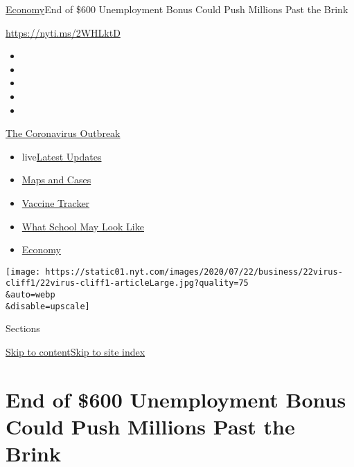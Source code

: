 \href{/section/business/economy}{Economy}\textbar{}End of \$600
Unemployment Bonus Could Push Millions Past the Brink

\url{https://nyti.ms/2WHLktD}

\begin{itemize}
\item
\item
\item
\item
\item
\end{itemize}

\href{https://www.nytimes.com/news-event/coronavirus?action=click\&pgtype=Article\&state=default\&region=TOP_BANNER\&context=storylines_menu}{The
Coronavirus Outbreak}

\begin{itemize}
\tightlist
\item
  live\href{https://www.nytimes.com/2020/08/01/world/coronavirus-covid-19.html?action=click\&pgtype=Article\&state=default\&region=TOP_BANNER\&context=storylines_menu}{Latest
  Updates}
\item
  \href{https://www.nytimes.com/interactive/2020/us/coronavirus-us-cases.html?action=click\&pgtype=Article\&state=default\&region=TOP_BANNER\&context=storylines_menu}{Maps
  and Cases}
\item
  \href{https://www.nytimes.com/interactive/2020/science/coronavirus-vaccine-tracker.html?action=click\&pgtype=Article\&state=default\&region=TOP_BANNER\&context=storylines_menu}{Vaccine
  Tracker}
\item
  \href{https://www.nytimes.com/interactive/2020/07/29/us/schools-reopening-coronavirus.html?action=click\&pgtype=Article\&state=default\&region=TOP_BANNER\&context=storylines_menu}{What
  School May Look Like}
\item
  \href{https://www.nytimes.com/live/2020/07/31/business/stock-market-today-coronavirus?action=click\&pgtype=Article\&state=default\&region=TOP_BANNER\&context=storylines_menu}{Economy}
\end{itemize}

\texttt{[image: https://static01.nyt.com/images/2020/07/22/business/22virus-cliff1/22virus-cliff1-articleLarge.jpg?quality=75\\\&auto=webp\\\&disable=upscale]}

Sections

\protect\hyperlink{site-content}{Skip to
content}\protect\hyperlink{site-index}{Skip to site index}

\hypertarget{end-of-600-unemployment-bonus-could-push-millions-past-the-brink}{%
\section{End of \$600 Unemployment Bonus Could Push Millions Past the
Brink}\label{end-of-600-unemployment-bonus-could-push-millions-past-the-brink}}

